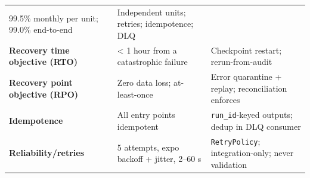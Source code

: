 \documentclass[
  11pt,
  british,
  oneside]{book}
\begin{document}
\begin{longtable}[]{@{}lll@{}}
\begin{minipage}[t]{0.30\columnwidth}
99.5\% monthly per unit; 99.0\% end-to-end\strut
\end{minipage} & \begin{minipage}[t]{0.30\columnwidth}\raggedright
Independent units; retries; idempotence; DLQ\strut
\end{minipage}\tabularnewline
\begin{minipage}[t]{0.30\columnwidth}\raggedright
\textbf{Recovery time objective (RTO)}\strut
\end{minipage} & \begin{minipage}[t]{0.30\columnwidth}\raggedright
\textless{} 1 hour from a catastrophic failure\strut
\end{minipage} & \begin{minipage}[t]{0.30\columnwidth}\raggedright
Checkpoint restart; rerun-from-audit\strut
\end{minipage}\tabularnewline
\begin{minipage}[t]{0.30\columnwidth}\raggedright
\textbf{Recovery point objective (RPO)}\strut
\end{minipage} & \begin{minipage}[t]{0.30\columnwidth}\raggedright
Zero data loss; at-least-once\strut
\end{minipage} & \begin{minipage}[t]{0.30\columnwidth}\raggedright
Error quarantine + replay; reconciliation enforces\strut
\end{minipage}\tabularnewline
\begin{minipage}[t]{0.30\columnwidth}\raggedright
\textbf{Idempotence}\strut
\end{minipage} & \begin{minipage}[t]{0.30\columnwidth}\raggedright
All entry points idempotent\strut
\end{minipage} & \begin{minipage}[t]{0.30\columnwidth}\raggedright
\texttt{run\_id}-keyed outputs; dedup in DLQ consumer\strut
\end{minipage}\tabularnewline
\begin{minipage}[t]{0.30\columnwidth}\raggedright
\textbf{Reliability/retries}\strut
\end{minipage} & \begin{minipage}[t]{0.30\columnwidth}\raggedright
5 attempts, expo backoff + jitter, 2--60 s\strut
\end{minipage} & \begin{minipage}[t]{0.30\columnwidth}\raggedright
\texttt{RetryPolicy}; integration-only; never validation\strut

\end{minipage}
\end{longtable}
\end{document}
